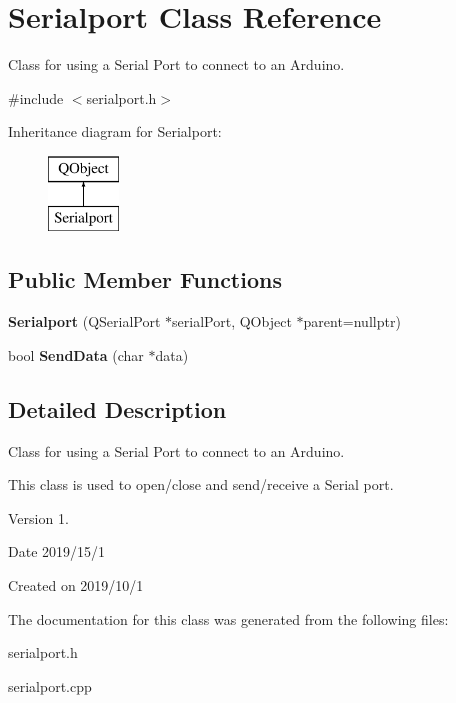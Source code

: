 \hypertarget{class_serialport}{}\section{Serialport Class Reference}
\label{class_serialport}


Class for using a Serial Port to connect to an Arduino.  




{\ttfamily \#include $<$serialport.\+h$>$}

Inheritance diagram for Serialport\+:\begin{figure}[H]
\begin{center}
\leavevmode
\includegraphics[height=2.000000cm]{class_serialport}
\end{center}
\end{figure}
\subsection*{Public Member Functions}
\begin{DoxyCompactItemize}
\item 
\mbox{\label{class_serialport_aca16d9eec3f261695962acffa638209b}} 
{\bfseries Serialport} (Q\+Serial\+Port $\ast$serial\+Port, Q\+Object $\ast$parent=nullptr)
\item 
\mbox{\label{class_serialport_a4a969f236387ac532d4fc4563d4711e8}} 
bool {\bfseries Send\+Data} (char $\ast$data)
\end{DoxyCompactItemize}


\subsection{Detailed Description}
Class for using a Serial Port to connect to an Arduino. 

This class is used to open/close and send/receive a Serial port.

\begin{DoxyVersion}{Version}
1.
\end{DoxyVersion}
\begin{DoxyDate}{Date}
2019/15/1
\end{DoxyDate}
Created on 2019/10/1 

The documentation for this class was generated from the following files\+:\begin{DoxyCompactItemize}
\item 
serialport.\+h\item 
serialport.\+cpp\end{DoxyCompactItemize}
